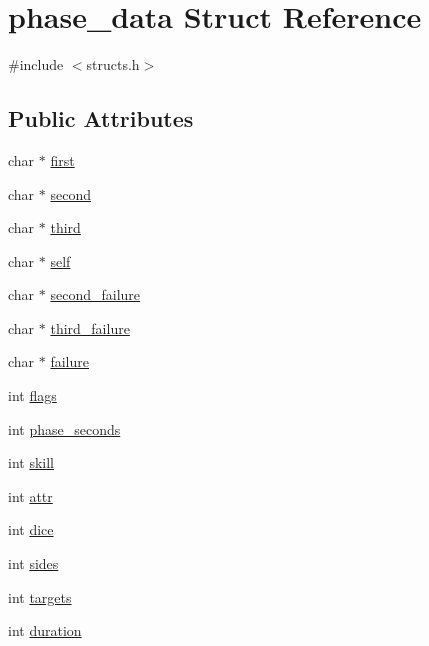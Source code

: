 \hypertarget{structphase__data}{\section{phase\-\_\-data Struct Reference}
\label{structphase__data}
}


{\ttfamily \#include $<$structs.\-h$>$}

\subsection*{Public Attributes}
\begin{DoxyCompactItemize}
\item 
char $\ast$ \hyperlink{structphase__data_a42c06b3b9dc664bd812e161183f59da2}{first}
\item 
char $\ast$ \hyperlink{structphase__data_a96f7fea73880bf5e02418ab7e7f0ae8b}{second}
\item 
char $\ast$ \hyperlink{structphase__data_a0c04e9a284187a2d4b3efd398123c478}{third}
\item 
char $\ast$ \hyperlink{structphase__data_af02ac5eea8ee0e8f3ec18c3013924722}{self}
\item 
char $\ast$ \hyperlink{structphase__data_a44c725df8c15fc1b52f433a3862e45f5}{second\-\_\-failure}
\item 
char $\ast$ \hyperlink{structphase__data_aa9dc36aa685d7e98fcbc3d66c885dd45}{third\-\_\-failure}
\item 
char $\ast$ \hyperlink{structphase__data_a15eb92a44419b1e2fe576fd27a5ae34a}{failure}
\item 
int \hyperlink{structphase__data_a696b0752c0346de04a5665fa77d67977}{flags}
\item 
int \hyperlink{structphase__data_a89b3c562c8cde0e24d724b3590fac504}{phase\-\_\-seconds}
\item 
int \hyperlink{structphase__data_ad0b916995a6394256002864847f4a612}{skill}
\item 
int \hyperlink{structphase__data_a4e4e14095ec3bf8768d18863e58c9b7e}{attr}
\item 
int \hyperlink{structphase__data_a992801e12a392136950a9781cf468ebe}{dice}
\item 
int \hyperlink{structphase__data_af47fb03a275da24491083f4008be3b6f}{sides}
\item 
int \hyperlink{structphase__data_a3be021007accb720721212185d857e54}{targets}
\item 
int \hyperlink{structphase__data_a9cbd274561249b0a38609a352674184d}{duration}

\end{DoxyCompactItemize}
